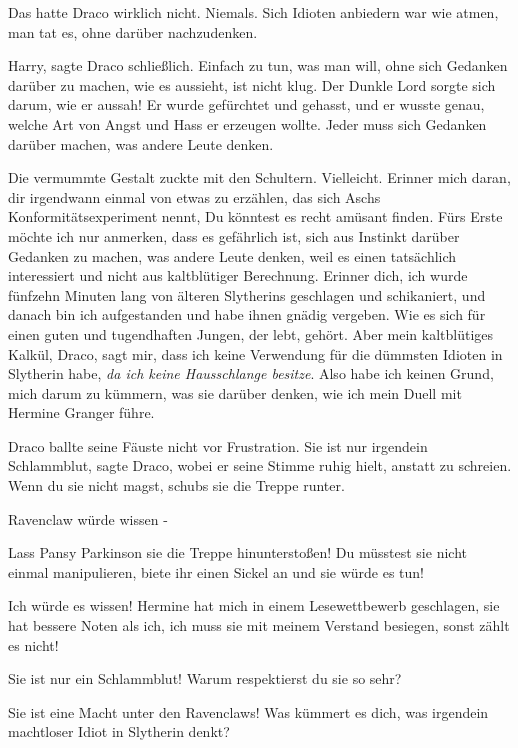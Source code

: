 Das hatte Draco wirklich nicht. Niemals. Sich Idioten anbiedern war wie atmen,
man tat es, ohne darüber nachzudenken.

\glqq Harry\grqq{}, sagte Draco schließlich. \glqq Einfach zu tun, was man will,
ohne sich Gedanken darüber zu machen, wie es aussieht, ist nicht klug. Der
Dunkle Lord sorgte sich darum, wie er aussah! Er wurde gefürchtet und gehasst,
und er wusste genau, welche Art von Angst und Hass er erzeugen wollte. Jeder
muss sich Gedanken darüber machen, was andere Leute denken.\grqq{}

Die vermummte Gestalt zuckte mit den Schultern. \glqq Vielleicht. Erinner mich
daran, dir irgendwann einmal von etwas zu erzählen, das sich Aschs
Konformitätsexperiment nennt, Du könntest es recht amüsant finden. Fürs Erste
möchte ich nur anmerken, dass es gefährlich ist, sich aus Instinkt darüber
Gedanken zu machen, was andere Leute denken, weil es einen tatsächlich
interessiert und nicht aus kaltblütiger Berechnung. Erinner dich, ich wurde
fünfzehn Minuten lang von älteren Slytherins geschlagen und schikaniert, und
danach bin ich aufgestanden und habe ihnen gnädig vergeben. Wie es sich für
einen guten und tugendhaften Jungen, der lebt, gehört. Aber mein kaltblütiges
Kalkül, Draco, sagt mir, dass ich keine Verwendung für die dümmsten Idioten in
Slytherin habe, \emph{da ich keine Hausschlange besitze}. Also habe ich keinen
Grund, mich darum zu kümmern, was sie darüber denken, wie ich mein Duell mit
Hermine Granger führe.\grqq{}

Draco ballte seine Fäuste nicht vor Frustration. \glqq Sie ist nur irgendein
Schlammblut\grqq{}, sagte Draco, wobei er seine Stimme ruhig hielt, anstatt zu
schreien. \glqq Wenn du sie nicht magst, schubs sie die Treppe runter.\grqq{}

\glqq Ravenclaw würde wissen -\grqq{}

\glqq Lass Pansy Parkinson sie die Treppe hinunterstoßen! Du müsstest sie nicht
einmal manipulieren, biete ihr einen Sickel an und sie würde es tun!\grqq{}

\glqq Ich würde es wissen! Hermine hat mich in einem Lesewettbewerb geschlagen,
sie hat bessere Noten als ich, ich muss sie mit meinem Verstand besiegen, sonst
zählt es nicht!\grqq{}

\glqq Sie ist nur ein Schlammblut! Warum respektierst du sie so sehr?\grqq{}

\glqq Sie ist eine Macht unter den Ravenclaws! Was kümmert es dich, was
irgendein machtloser Idiot in Slytherin denkt?\grqq{}

